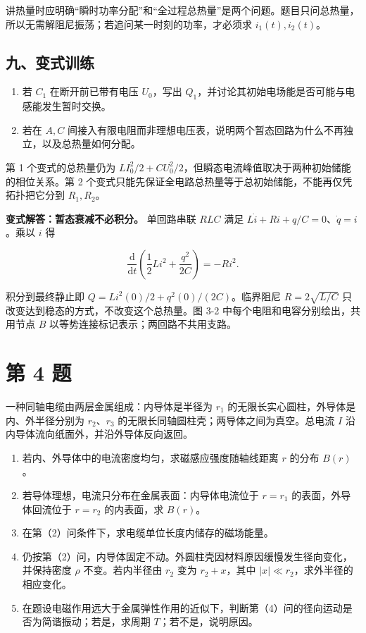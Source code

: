 \documentclass[12pt,a4paper,UTF8]{ctexart}
\newcommand{\tightlist}{\setlength{\itemsep}{0pt}\setlength{\parskip}{0pt}}
\begin{document}
讲热量时应明确``瞬时功率分配''和``全过程总热量''是两个问题。题目只问总热量，所以无需解阻尼振荡；若追问某一时刻的功率，才必须求
\(i_1(t),i_2(t)\)。

\subsection{九、变式训练}\label{ux4e5dux53d8ux5f0fux8badux7ec3-2}

\begin{enumerate}
\def\labelenumi{\arabic{enumi}.}
\tightlist
\item
  若 \(C_1\) 在断开前已带有电压 \(U_0\)，写出
  \(Q_1\)，并讨论其初始电场能是否可能与电感能发生暂时交换。
\item
  若在 \(A,C\)
  间接入有限电阻而非理想电压表，说明两个暂态回路为什么不再独立，以及总热量如何分配。
\end{enumerate}

第 1 个变式的总热量仍为
\(LI_0^2/2+CU_0^2/2\)，但瞬态电流峰值取决于两种初始储能的相位关系。第 2
个变式只能先保证全电路总热量等于总初始储能，不能再仅凭拓扑把它分到
\(R_1,R_2\)。

\textbf{变式解答：暂态衰减不必积分。} 单回路串联 \(RLC\) 满足
\(L\dot i+Ri+q/C=0\)、\(\dot q=i\)。乘以 \(i\) 得

\[\frac{\mathrm d}{\mathrm dt}\left(\frac12Li^2+\frac{q^2}{2C}\right)=-Ri^2.\]

积分到最终静止即 \(Q=Li^2(0)/2+q^2(0)/(2C)\)。临界阻尼 \(R=2\sqrt{L/C}\)
只改变达到稳态的方式，不改变这个总热量。图 3-2
中每个电阻和电容分别绘出，共用节点 \(B\)
以等势连接标记表示；两回路不共用支路。

\newpage

\section{第 4 题}\label{ux7b2c-4-ux9898}

一种同轴电缆由两层金属组成：内导体是半径为 \(r_1\)
的无限长实心圆柱，外导体是内、外半径分别为 \(r_2\)、\(r_3\)
的无限长同轴圆柱壳；两导体之间为真空。总电流 \(I\)
沿内导体流向纸面外，并沿外导体反向返回。

\begin{enumerate}
\def\labelenumi{\arabic{enumi}.}
\tightlist
\item
  若内、外导体中的电流密度均匀，求磁感应强度随轴线距离 \(r\) 的分布
  \(B(r)\)。
\item
  若导体理想，电流只分布在金属表面：内导体电流位于 \(r=r_1\)
  的表面，外导体回流位于 \(r=r_2\) 的内表面，求 \(B(r)\)。
\item
  在第（2）问条件下，求电缆单位长度内储存的磁场能量。
\item
  仍按第（2）问，内导体固定不动。外圆柱壳因材料原因缓慢发生径向变化，并保持密度
  \(\rho\) 不变。若内半径由 \(r_2\) 变为 \(r_2+x\)，其中
  \(|x|\ll r_2\)，求外半径的相应变化。
\item
  在题设电磁作用远大于金属弹性作用的近似下，判断第（4）问的径向运动是否为简谐振动；若是，求周期
  \(T\)；若不是，说明原因。
\end{enumerate}
\end{document}
